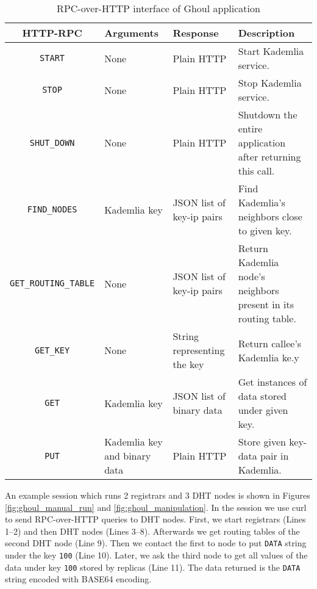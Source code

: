 \begin{table}[tbp]
  \begin{tabular}{|c|p{3cm}|p{3.6cm}|p{3.4cm}|}
    \hline
    HTTP-RPC & Arguments & Response & Description \\
    \hline
    \texttt{START} & None & Plain HTTP & Start Kademlia service.\\
    \hline
    \texttt{STOP} & None & Plain HTTP  & Stop Kademlia service.\\
    \hline
    \texttt{SHUT\_DOWN} & None & Plain HTTP &
      Shutdown the entire application after returning this call.\\
    \hline
    \texttt{FIND\_NODES} & Kademlia key & JSON list of key-ip pairs &
      Find Kademlia's neighbors close to given key.\\
    \hline
    \texttt{GET\_ROUTING\_TABLE} & None & JSON list of key-ip pairs & Return
      Kademlia node's neighbors present in its routing table.\\
    \hline
    \texttt{GET\_KEY} & None & String representing the key & Return callee's
      Kademlia ke.y\\
    \hline
    \texttt{GET} & Kademlia key  & JSON list of binary data & Get instances of
    data stored under given key. \\
    \hline
    \texttt{PUT} & Kademlia key and binary data  & Plain HTTP & Store given
    key-data pair in Kademlia. \\
    \hline
  \end{tabular}
  \caption{RPC-over-HTTP interface of Ghoul application}
  \label{tab:http_rpc}
\end{table}

An example session which runs 2 registrars and 3 DHT nodes is shown in Figures 
\ref{fig:ghoul_manual_run} and \ref{fig:ghoul_manipulation}.
In the session we use curl to send RPC-over-HTTP queries to DHT nodes.
First, we start registrars (Lines 1--2) and then DHT nodes (Lines 3--8).
Afterwards we get routing tables of the second DHT node (Line 9).
Then we contact the first to node to put \texttt{DATA} string under the key
\texttt{100} (Line 10).
Later, we ask the third node to get all values of the data under key
\texttt{100} stored by replicas (Line 11).
The data returned is the \texttt{DATA} string encoded with BASE64 encoding.

